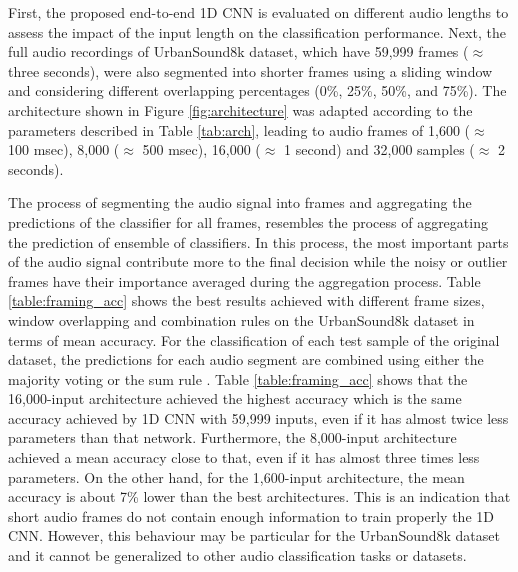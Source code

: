 \documentclass[preprint,final,12pt]{elsarticle}
\begin{document}
First, the proposed end-to-end 1D CNN is evaluated on different audio lengths to assess the impact of the input length on the classification performance. Next, the full audio recordings of UrbanSound8k dataset, which have 59,999 frames ($\approx$ three seconds), were also segmented into shorter frames using a sliding window and considering different overlapping percentages (0\%, 25\%, 50\%, and 75\%). The architecture shown in Figure \ref{fig:architecture} was adapted according to the parameters described in Table \ref{tab:arch}, leading to audio frames of 1,600 ($\approx$ 100 msec), 8,000 ($\approx$ 500 msec), 16,000 ($\approx$ 1 second) and 32,000 samples ($\approx$ 2 seconds).

The process of segmenting the audio signal into frames and aggregating the predictions of the classifier for all frames, resembles the process of aggregating the prediction of ensemble of classifiers. In this process, the most important parts of the audio signal contribute more to the final decision while the noisy or outlier frames have their importance averaged during the aggregation process. Table \ref{table:framing_acc} shows the best results achieved with different frame sizes, window overlapping and combination rules on the UrbanSound8k dataset in terms of mean accuracy. For the classification of each test sample of the original dataset, the predictions for each audio segment are combined using either the majority voting or the sum rule \citep{kittler1998combining}. Table \ref{table:framing_acc} shows that the 16,000-input architecture achieved the highest accuracy which is the same accuracy achieved by 1D CNN with 59,999 inputs, even if it has almost twice less parameters than that network. Furthermore, the 8,000-input architecture achieved a mean accuracy close to that, even if it has almost three times less parameters. On the other hand, for the 1,600-input architecture, the mean accuracy is about 7\% lower than the best architectures. This is an indication that short audio frames do not contain enough information to train properly the 1D CNN. However, this behaviour may be particular for the UrbanSound8k dataset and it cannot be generalized to other audio classification tasks or datasets.
\end{document}
